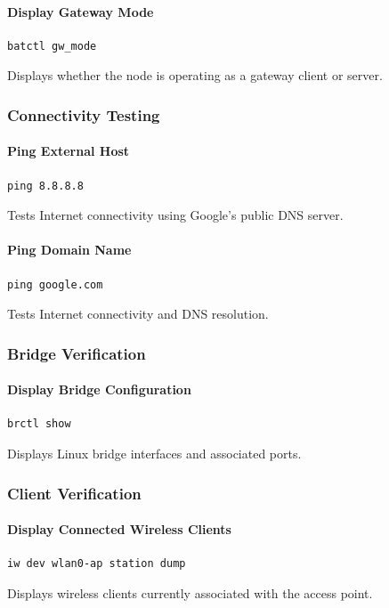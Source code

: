 \documentclass[conference]{IEEEtran}
\begin{document}
\paragraph{Display Gateway Mode}
\begin{verbatim}
batctl gw_mode
\end{verbatim}
Displays whether the node is operating as a gateway client or server.

\subsubsection{Connectivity Testing}

\paragraph{Ping External Host}
\begin{verbatim}
ping 8.8.8.8
\end{verbatim}
Tests Internet connectivity using Google's public DNS server.

\paragraph{Ping Domain Name}
\begin{verbatim}
ping google.com
\end{verbatim}
Tests Internet connectivity and DNS resolution.

\subsubsection{Bridge Verification}

\paragraph{Display Bridge Configuration}
\begin{verbatim}
brctl show
\end{verbatim}
Displays Linux bridge interfaces and associated ports.

\subsubsection{Client Verification}

\paragraph{Display Connected Wireless Clients}
\begin{verbatim}
iw dev wlan0-ap station dump
\end{verbatim}
Displays wireless clients currently associated with the access point.
\end{document}
